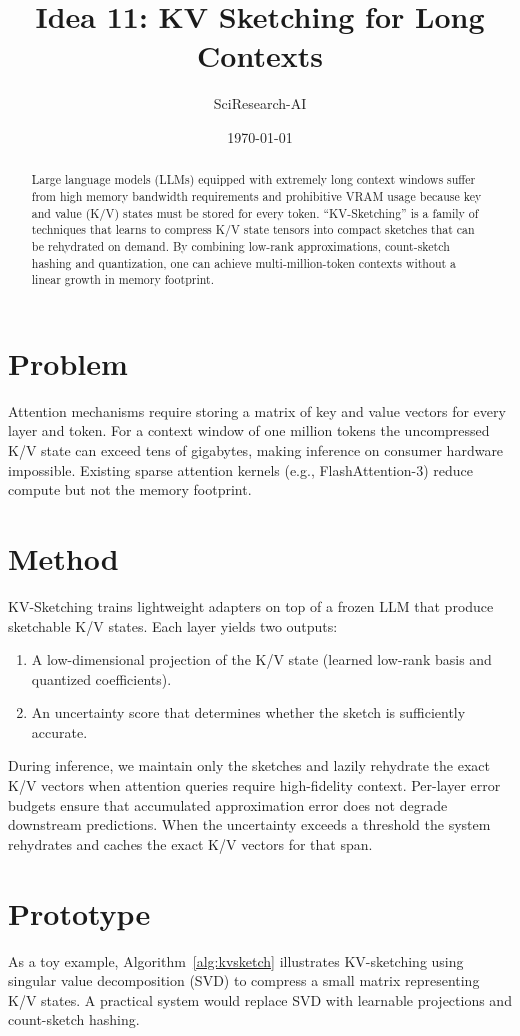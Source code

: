 \documentclass{article}
\title{Idea 11: KV Sketching for Long Contexts}
\author{SciResearch-AI}
\date{\today}
\begin{document}
\maketitle

\begin{abstract}
Large language models (LLMs) equipped with extremely long context
windows suffer from high memory bandwidth requirements and prohibitive
VRAM usage because key and value (K/V) states must be stored for every
token.  ``KV-Sketching'' is a family of techniques that learns to
compress K/V state tensors into compact sketches that can be
rehydrated on demand.  By combining low-rank approximations,
count-sketch hashing and quantization, one can achieve multi-million-token
contexts without a linear growth in memory footprint.
\end{abstract}

\section{Problem}
Attention mechanisms require storing a matrix of key and value vectors for
every layer and token.  For a context window of one million tokens the
uncompressed K/V state can exceed tens of gigabytes, making inference on
consumer hardware impossible.  Existing sparse attention kernels (e.g.,
FlashAttention-3) reduce compute but not the memory footprint.

\section{Method}
KV-Sketching trains lightweight adapters on top of a frozen LLM that
produce sketchable K/V states.  Each layer yields two outputs:
\begin{enumerate}
  \item A low-dimensional projection of the K/V state (learned low-rank
        basis and quantized coefficients).
  \item An uncertainty score that determines whether the sketch is
        sufficiently accurate.
\end{enumerate}
During inference, we maintain only the sketches and lazily rehydrate
the exact K/V vectors when attention queries require high-fidelity
context.  Per-layer error budgets ensure that accumulated approximation
error does not degrade downstream predictions.  When the uncertainty
exceeds a threshold the system rehydrates and caches the exact K/V
vectors for that span.

\section{Prototype}
As a toy example, Algorithm~\ref{alg:kvsketch} illustrates
KV-sketching using singular value decomposition (SVD) to compress a
small matrix representing K/V states.  A practical system would
replace SVD with learnable projections and count-sketch hashing.
\end{document}
